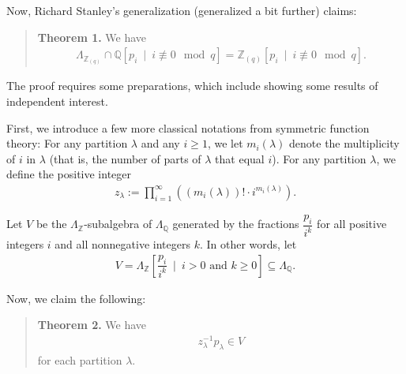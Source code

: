 \documentclass[10pt,a4paper]{article}
\begin{document}
Now, Richard Stanley's generalization (generalized a bit further) claims:



\begin{quote}



\textbf{Theorem 1.} We have
\begin{align*}
\Lambda_{\mathbb{Z}_{\left(  q\right)  }}\cap\mathbb{Q}\left[  p_{i}
\ \mid\ i\not \equiv 0\mod q\right]  =\mathbb{Z}_{\left(
q\right)  }\left[  p_{i}\ \mid\ i\not \equiv 0\mod q\right]  .
\end{align*}



\end{quote}



The proof requires some preparations, which include showing some results of
independent interest.




First, we introduce a few more classical notations from symmetric function
theory: For any partition $\lambda$ and any $i\geq1$, we let $m_{i}\left(
\lambda\right)  $ denote the multiplicity of $i$ in $\lambda$ (that is, the
number of parts of $\lambda$ that equal $i$). For any partition $\lambda$, we
define the positive integer
\begin{align*}
z_{\lambda}:=\prod_{i=1}^{\infty}\left(  \left(  m_{i}\left(  \lambda\right)
\right)  !\cdot i^{m_{i}\left(  \lambda\right)  }\right)  .
\end{align*}




Let $V$ be the $\Lambda_{\mathbb{Z}}$-subalgebra of $\Lambda_{\mathbb{Q}}$
generated by the fractions $\dfrac{p_{i}}{i^{k}}$ for all positive integers
$i$ and all nonnegative integers $k$. In other words, let
\begin{align*}
V=\Lambda_{\mathbb{Z}}\left[  \dfrac{p_{i}}{i^{k}}\ \mid\ i>0\text{ and }
k\geq0\right]  \subseteq\Lambda_{\mathbb{Q}}.
\end{align*}




Now, we claim the following:



\begin{quote}



\textbf{Theorem 2.} We have
\begin{align*}
z_{\lambda}^{-1}p_{\lambda}\in V
\end{align*}
for each partition $\lambda$.



\end{quote}
\end{document}

